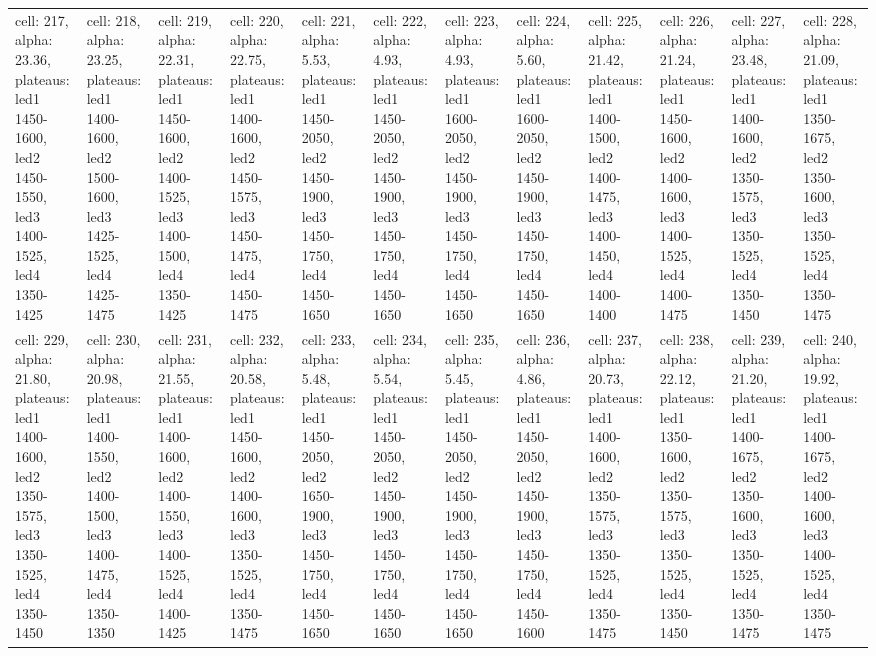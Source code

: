 \begin{landscape}
\begin{longtable}{|l|l|l|l|l|l|l|l|l|l|l|l|}
\rowcolor{lightgray} cell: 217, alpha: 23.36, plateaus: led1 1450-1600, led2 1450-1550, led3 1400-1525, led4 1350-1425 &cell: 218, alpha: 23.25, plateaus: led1 1400-1600, led2 1500-1600, led3 1425-1525, led4 1425-1475 &cell: 219, alpha: 22.31, plateaus: led1 1450-1600, led2 1400-1525, led3 1400-1500, led4 1350-1425 &cell: 220, alpha: 22.75, plateaus: led1 1400-1600, led2 1450-1575, led3 1450-1475, led4 1450-1475 &cell: 221, alpha: 5.53, plateaus: led1 1450-2050, led2 1450-1900, led3 1450-1750, led4 1450-1650 &cell: 222, alpha: 4.93, plateaus: led1 1450-2050, led2 1450-1900, led3 1450-1750, led4 1450-1650 &cell: 223, alpha: 4.93, plateaus: led1 1600-2050, led2 1450-1900, led3 1450-1750, led4 1450-1650 &cell: 224, alpha: 5.60, plateaus: led1 1600-2050, led2 1450-1900, led3 1450-1750, led4 1450-1650 &cell: 225, alpha: 21.42, plateaus: led1 1400-1500, led2 1400-1475, led3 1400-1450, led4 1400-1400 &cell: 226, alpha: 21.24, plateaus: led1 1450-1600, led2 1400-1600, led3 1400-1525, led4 1400-1475 &cell: 227, alpha: 23.48, plateaus: led1 1400-1600, led2 1350-1575, led3 1350-1525, led4 1350-1450 &cell: 228, alpha: 21.09, plateaus: led1 1350-1675, led2 1350-1600, led3 1350-1525, led4 1350-1475 \\
cell: 229, alpha: 21.80, plateaus: led1 1400-1600, led2 1350-1575, led3 1350-1525, led4 1350-1450 &cell: 230, alpha: 20.98, plateaus: led1 1400-1550, led2 1400-1500, led3 1400-1475, led4 1350-1350 &cell: 231, alpha: 21.55, plateaus: led1 1400-1600, led2 1400-1550, led3 1400-1525, led4 1400-1425 &cell: 232, alpha: 20.58, plateaus: led1 1450-1600, led2 1400-1600, led3 1350-1525, led4 1350-1475 &cell: 233, alpha: 5.48, plateaus: led1 1450-2050, led2 1650-1900, led3 1450-1750, led4 1450-1650 &cell: 234, alpha: 5.54, plateaus: led1 1450-2050, led2 1450-1900, led3 1450-1750, led4 1450-1650 &cell: 235, alpha: 5.45, plateaus: led1 1450-2050, led2 1450-1900, led3 1450-1750, led4 1450-1650 &cell: 236, alpha: 4.86, plateaus: led1 1450-2050, led2 1450-1900, led3 1450-1750, led4 1450-1600 &cell: 237, alpha: 20.73, plateaus: led1 1400-1600, led2 1350-1575, led3 1350-1525, led4 1350-1475 &cell: 238, alpha: 22.12, plateaus: led1 1350-1600, led2 1350-1575, led3 1350-1525, led4 1350-1450 &cell: 239, alpha: 21.20, plateaus: led1 1400-1675, led2 1350-1600, led3 1350-1525, led4 1350-1475 &cell: 240, alpha: 19.92, plateaus: led1 1400-1675, led2 1400-1600, led3 1400-1525, led4 1350-1475 \\

\end{longtable}
\end{landscape}
